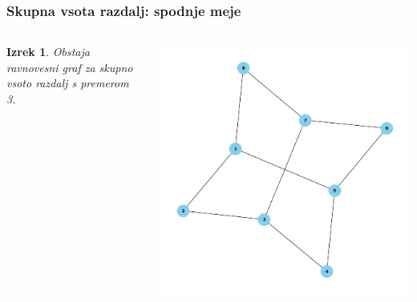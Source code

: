 \documentclass[12pt, hyperref={unicode}]{beamer}
\newtheorem{izrek}{Izrek}
\begin{document}
\begin{frame}
  
  \frametitle{Skupna vsota razdalj: spodnje meje}
  \begin{columns}
    \begin{izrek}
      Obstaja ravnovesni graf za skupno vsoto razdalj s premerom 3.
    \end{izrek}
    \includegraphics[width=1\textwidth]{vsota_premer_3.png}
  \end{columns}
  
\end{frame}

\end{document}

